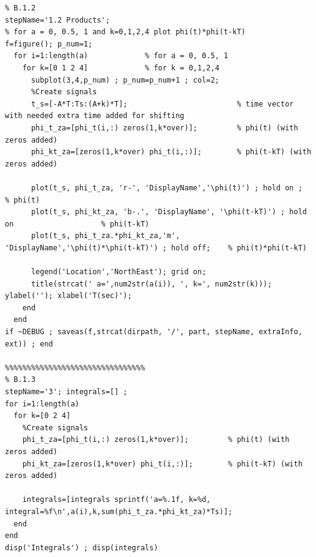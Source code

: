 \documentclass[11pt]{article}
\begin{document}
\begin{lstlisting}[caption = {\texttt{part\_b.m}}]
%%%%%%%%%%%%%%%%%%%%%%%%%%%%%%%%
% B.1.2
stepName='1.2 Products'; 
% for a = 0, 0.5, 1 and k=0,1,2,4 plot phi(t)*phi(t-kT)
f=figure(); p_num=1;
  for i=1:length(a)             % for a = 0, 0.5, 1
    for k=[0 1 2 4]             % for k = 0,1,2,4
      subplot(3,4,p_num) ; p_num=p_num+1 ; col=2;
      %Create signals
      t_s=[-A*T:Ts:(A+k)*T];                         % time vector with needed extra time added for shifting
      phi_t_za=[phi_t(i,:) zeros(1,k*over)];         % phi(t) (with zeros added)
      phi_kt_za=[zeros(1,k*over) phi_t(i,:)];        % phi(t-kT) (with zeros added)
      
      plot(t_s, phi_t_za, 'r-', 'DisplayName','\phi(t)') ; hold on ;                        % phi(t) 
      plot(t_s, phi_kt_za, 'b-.', 'DisplayName', '\phi(t-kT)') ; hold on                    % phi(t-kT)
      plot(t_s, phi_t_za.*phi_kt_za,'m', 'DisplayName','\phi(t)*\phi(t-kT)') ; hold off;    % phi(t)*phi(t-kT) 
      
      legend('Location','NorthEast'); grid on;
      title(strcat(' a=',num2str(a(i)), ', k=', num2str(k))); ylabel(''); xlabel('T(sec)'); 
    end
  end
if ~DEBUG ; saveas(f,strcat(dirpath, '/', part, stepName, extraInfo, ext)) ; end

%%%%%%%%%%%%%%%%%%%%%%%%%%%%%%%%
% B.1.3
stepName='3'; integrals=[] ;
for i=1:length(a)
  for k=[0 2 4]
    %Create signals
    phi_t_za=[phi_t(i,:) zeros(1,k*over)];         % phi(t) (with zeros added)
    phi_kt_za=[zeros(1,k*over) phi_t(i,:)];        % phi(t-kT) (with zeros added)
  
    integrals=[integrals sprintf('a=%.1f, k=%d, integral=%f\n',a(i),k,sum(phi_t_za.*phi_kt_za)*Ts)];
  end
end
disp('Integrals') ; disp(integrals)
\end{lstlisting}
\end{document}
